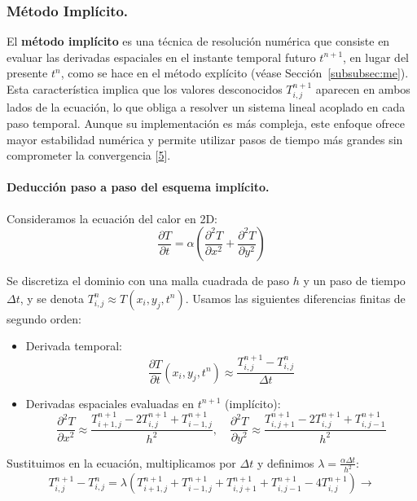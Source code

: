 \documentclass{article}
\begin{document}
\subsubsection{Método Implícito.}
\label{subsubsec:mi}
El \textbf{método implícito} es una técnica de resolución numérica que consiste en evaluar las derivadas espaciales en el instante temporal futuro $t^{n+1}$, en lugar del presente $t^n$, como se hace en el método explícito (véase Sección~\ref{subsubsec:me}). Esta característica implica que los valores desconocidos $T_{i,j}^{n+1}$ aparecen en ambos lados de la ecuación, lo que obliga a resolver un sistema lineal acoplado en cada paso temporal. Aunque su implementación es más compleja, este enfoque ofrece mayor estabilidad numérica y permite utilizar pasos de tiempo más grandes sin comprometer la convergencia [\href{https://www.ugr.es/~prodelas/ftp/ETSICCP/Resoluci%F3nNum%E9ricaEDPs.pdf}{5}].

\paragraph{Deducción paso a paso del esquema implícito.} Consideramos la ecuación del calor en 2D:
\begin{equation}
    \frac{\partial T}{\partial t} = \alpha \left( \frac{\partial^2 T}{\partial x^2} + \frac{\partial^2 T}{\partial y^2} \right)
\end{equation}

Se discretiza el dominio con una malla cuadrada de paso $h$ y un paso de tiempo $\Delta t$, y se denota $T_{i,j}^n \approx T(x_i, y_j, t^n)$. Usamos las siguientes diferencias finitas de segundo orden:
\begin{itemize}
    \item Derivada temporal:
    $$
    \frac{\partial T}{\partial t}(x_i, y_j, t^n) \approx \frac{T_{i,j}^{n+1} - T_{i,j}^{n}}{\Delta t}
    $$
    \item Derivadas espaciales evaluadas en $t^{n+1}$ (implícito):
    $$
    \frac{\partial^2 T}{\partial x^2} \approx \frac{T_{i+1,j}^{n+1} - 2T_{i,j}^{n+1} + T_{i-1,j}^{n+1}}{h^2}, \quad
    \frac{\partial^2 T}{\partial y^2} \approx \frac{T_{i,j+1}^{n+1} - 2T_{i,j}^{n+1} + T_{i,j-1}^{n+1}}{h^2}
    $$
\end{itemize}
Sustituimos en la ecuación, multiplicamos por $\Delta t$ y definimos $\lambda = \frac{\alpha \Delta t}{h^2}$:
$$
T_{i,j}^{n+1} - T_{i,j}^{n} = 
\lambda \left(
T_{i+1,j}^{n+1} + T_{i-1,j}^{n+1} + T_{i,j+1}^{n+1} + T_{i,j-1}^{n+1} - 4T_{i,j}^{n+1}
\right) \xrightarrow[]{}
$$
\end{document}
